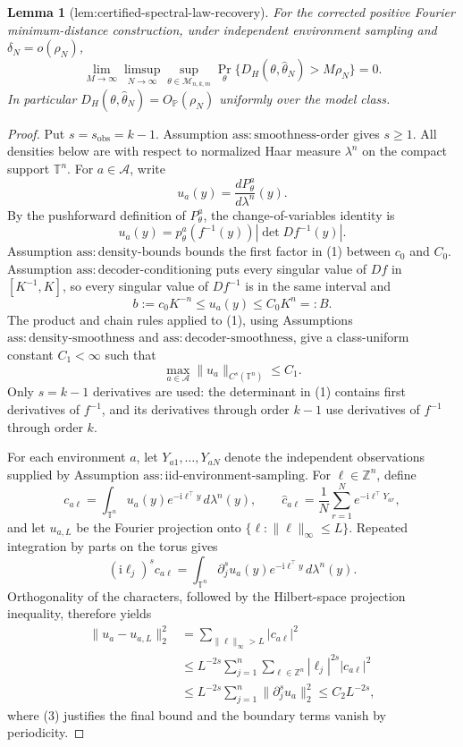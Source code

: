 \documentclass{article}
\newtheorem{lemma}{Lemma}
\begin{document}
\begin{lemma}[lem:certified-spectral-law-recovery]\label{lem:certified-spectral-law-recovery}
For the corrected positive Fourier minimum-distance construction, under independent environment sampling and \(\delta_N=o(\rho_N)\),
\[
\lim_{M\to\infty}\limsup_{N\to\infty}
\sup_{\theta\in\mathcal M_{n,k,m}}
\Pr_\theta\{D_H(\theta,\widehat\theta_N)>M\rho_N\}=0.
\]
In particular \(D_H(\theta,\widehat\theta_N)=O_{\mathbb P}(\rho_N)\) uniformly over the model class.
\end{lemma}
\begin{proof}
Put \(s=s_{\mathrm{obs}}=k-1\).  Assumption \(\mathrm{ass:smoothness\text{-}order}\) gives \(s\geq 1\).  All densities below are with respect to normalized Haar measure \(\lambda^n\) on the compact support \(\mathbb T^n\).  For \(a\in\mathcal A\), write
\[
 u_a(y)=\frac{dP_\theta^a}{d\lambda^n}(y).
\]
By the pushforward definition of \(P_\theta^a\), the change-of-variables identity is
\[
 u_a(y)=p_\theta^a\!\left(f^{-1}(y)\right)
          \left|\det Df^{-1}(y)\right|.
\tag{1}
\]
Assumption \(\mathrm{ass:density\text{-}bounds}\) bounds the first factor in (1) between \(c_0\) and \(C_0\).  Assumption \(\mathrm{ass:decoder\text{-}conditioning}\) puts every singular value of \(Df\) in \([K^{-1},K]\), so every singular value of \(Df^{-1}\) is in the same interval and
\[
 b:=c_0K^{-n}\leq u_a(y)\leq C_0K^n=:B.
\tag{2}
\]
The product and chain rules applied to (1), using Assumptions \(\mathrm{ass:density\text{-}smoothness}\) and \(\mathrm{ass:decoder\text{-}smoothness}\), give a class-uniform constant \(C_1<\infty\) such that
\[
 \max_{a\in\mathcal A}\lVert u_a\rVert_{C^s(\mathbb T^n)}\leq C_1.
\tag{3}
\]
Only \(s=k-1\) derivatives are used: the determinant in (1) contains first derivatives of \(f^{-1}\), and its derivatives through order \(k-1\) use derivatives of \(f^{-1}\) through order \(k\).

For each environment \(a\), let \(Y_{a1},\ldots,Y_{aN}\) denote the independent observations supplied by Assumption \(\mathrm{ass:iid\text{-}environment\text{-}sampling}\).  For \(\ell\in\mathbb Z^n\), define
\[
 c_{a\ell}=\int_{\mathbb T^n}u_a(y)e^{-\mathrm i\ell^\top y}\,d\lambda^n(y),
 \qquad
 \widehat c_{a\ell}=\frac1N\sum_{r=1}^N e^{-\mathrm i\ell^\top Y_{ar}},
\]
and let \(u_{a,L}\) be the Fourier projection onto \(\{\ell:\lVert\ell\rVert_\infty\leq L\}\).  Repeated integration by parts on the torus gives
\[
 (\mathrm i\ell_j)^s c_{a\ell}
 =\int_{\mathbb T^n}\partial_j^s u_a(y)e^{-\mathrm i\ell^\top y}\,d\lambda^n(y).
\]
Orthogonality of the characters, followed by the Hilbert-space projection inequality, therefore yields
\[
\begin{aligned}
 \lVert u_a-u_{a,L}\rVert_2^2
 &=\sum_{\lVert\ell\rVert_\infty>L}|c_{a\ell}|^2\\
 &\leq L^{-2s}\sum_{j=1}^n
       \sum_{\ell\in\mathbb Z^n}|\ell_j|^{2s}|c_{a\ell}|^2\\
 &\leq L^{-2s}\sum_{j=1}^n\lVert\partial_j^s u_a\rVert_2^2
 \leq C_2L^{-2s},
\end{aligned}
\tag{4}
\]
where (3) justifies the final bound and the boundary terms vanish by periodicity.


\end{proof}
\end{document}
